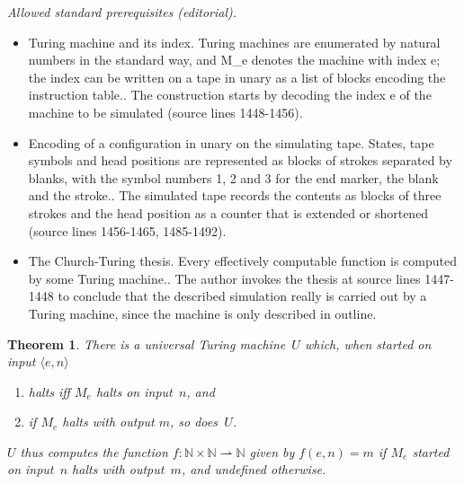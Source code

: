 \documentclass[10pt,a4paper]{article}
\theoremstyle{plain}
\newtheorem{thm}{Theorem}[section]
\theoremstyle{definition}
\theoremstyle{remark}
\newcommand*{\ollabel}[1]{\label{#1}}
\providecommand{\tuple}[1]{\langle #1 \rangle}
\providecommand{\Nat}{\ensuremath{\mathbb{N}}}
\providecommand{\pto}{\rightharpoonup}
\begin{document}
\noindent\textit{Allowed standard prerequisites (editorial).}\begin{itemize}
\item Turing machine and its index. Turing machines are enumerated by natural numbers in the standard way, and M\_e denotes the machine with index e; the index can be written on a tape in unary as a list of blocks encoding the instruction table.. The construction starts by decoding the index e of the machine to be simulated (source lines 1448-1456).
\item Encoding of a configuration in unary on the simulating tape. States, tape symbols and head positions are represented as blocks of strokes separated by blanks, with the symbol numbers 1, 2 and 3 for the end marker, the blank and the stroke.. The simulated tape records the contents as blocks of three strokes and the head position as a counter that is extended or shortened (source lines 1456-1465, 1485-1492).
\item The Church-Turing thesis. Every effectively computable function is computed by some Turing machine.. The author invokes the thesis at source lines 1447-1448 to conclude that the described simulation really is carried out by a Turing machine, since the machine is only described in outline.
\end{itemize}\medskip
\begin{thm}\ollabel{thm:universal-tm} There is a \emph{universal
  Turing machine}~$U$ which, when started on input $\tuple{e,n}$ 
  \begin{enumerate}
    \item halts iff $M_e$ halts on input~$n$, and
    \item if $M_e$ halts with output $m$, so does~$U$.
  \end{enumerate}
  $U$ thus computes the function $f\colon \Nat \times \Nat \pto \Nat$
  given by $f(e,n) = m$ if $M_e$ started on input~$n$ halts with
  output~$m$, and undefined otherwise.
\end{thm}
\end{document}
